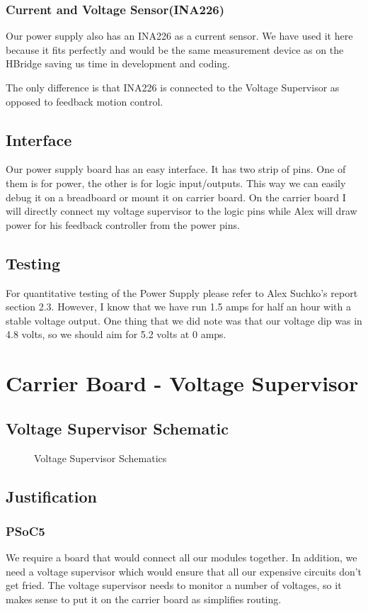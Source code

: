 \documentclass[12pt]{article}
\newcommand{\figuremine}[2]{
\begin{figure}[H]
\noindent\makebox[\textwidth]{
 \texttt{[image: \#1]}}
 \caption{#2}
\end{figure}
}
\begin{document}
\subsubsection{Current and Voltage Sensor(INA226)}
Our power supply also has an INA226 as a current sensor. We have used it here because it fits perfectly and would be the same measurement device as on the HBridge saving us time in development and coding. 

The only difference is that INA226 is connected to the Voltage Supervisor as opposed to feedback motion control.

\subsection{Interface}
Our power supply board has an easy interface. It has two strip of pins. One of them is for power, the other is for logic input/outputs. This way we can easily debug it on a breadboard or mount it on carrier board. On the carrier board I will directly connect my voltage supervisor to the logic pins while Alex will draw power for his feedback controller from the power pins.
\subsection{Testing}
For quantitative testing of the Power Supply please refer to Alex Suchko's report section 2.3. However, I know that we have run 1.5 amps for half an hour with a stable voltage output. One thing that we did note was that our voltage dip was in 4.8 volts, so we should aim for 5.2 volts at 0 amps.

\section{Carrier Board - Voltage Supervisor}
\subsection{Voltage Supervisor Schematic}
\figuremine{~/ece445/Chalk-Bot/Hardware/Carrier/page1.png}{Voltage Supervisor Schematics}
\subsection{Justification}
\subsubsection{PSoC5}
We require a board that would connect all our modules together. In addition, we need a voltage supervisor which would ensure that all our expensive circuits don't get fried. The voltage supervisor needs to monitor a number of voltages, so it makes sense to put it on the carrier board as simplifies routing.
\end{document}
